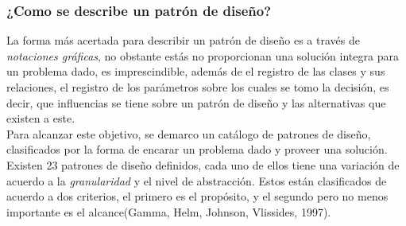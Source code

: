 \subsubsection {¿Como se describe un patrón de diseño?}
\noindent La forma más acertada para describir un patrón de diseño es a través de \textit {notaciones gráficas},
\noindent no obstante estás no proporcionan una solución integra para un problema dado, es imprescindible, además de
\noindent el registro de las clases y sus relaciones, el registro de los parámetros sobre los cuales se tomo la decisión,
\noindent es decir, que influencias se tiene sobre un patrón de diseño y las alternativas que existen a este.\\
\noindent Para alcanzar este objetivo, se demarco un catálogo de patrones de diseño, clasificados por la forma de encarar
\noindent un problema dado y proveer una solución.\\
\noindent Existen 23 patrones de diseño definidos, cada uno de ellos tiene una variación de acuerdo a la \textit{granularidad}
\noindent y el nivel de abstracción.
\noindent Estos están clasificados de acuerdo a dos criterios, el primero es el propósito, y el segundo
\noindent pero no menos importante es el alcance(Gamma, Helm, Johnson, Vlissides, 1997).\\
